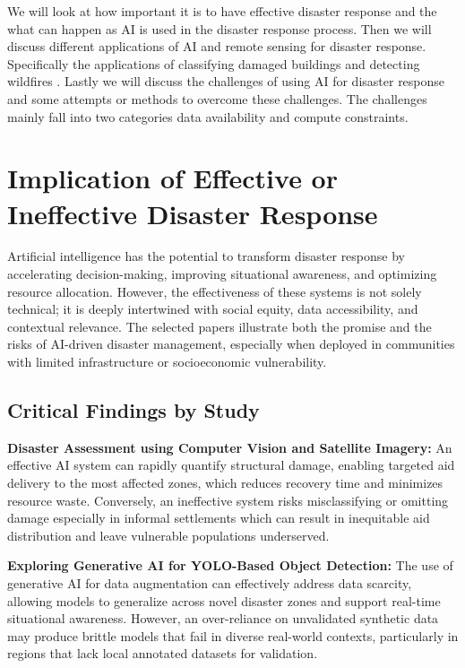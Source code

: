 \documentclass[conference,a4paper]{IEEEtran}
\begin{document}
We will look at how important it is to have effective disaster response and the what can happen as AI is used in the disaster response process. Then we will discuss different applications of AI and remote sensing for disaster response. Specifically the applications of classifying damaged buildings \cite{kimDisasterAssessmentUsing2022,teohExploringGenerativeAI2024,lagapEnhancingPostDisasterDamage2025} and detecting wildfires \cite{elbohy2025fusion,jiaoForestFirePatterns2023}. Lastly we will discuss the challenges of using AI for disaster response and some attempts or methods to overcome these challenges. The challenges mainly fall into two categories data availability and compute constraints.

\section{Implication of Effective or Ineffective Disaster Response}

Artificial intelligence has the potential to transform disaster response by accelerating decision-making, improving situational awareness, and optimizing resource allocation. However, the effectiveness of these systems is not solely technical; it is deeply intertwined with social equity, data accessibility, and contextual relevance. The selected papers illustrate both the promise and the risks of AI-driven disaster management, especially when deployed in communities with limited infrastructure or socioeconomic vulnerability.

\subsection{Critical Findings by Study}

\textbf{Disaster Assessment using Computer Vision and Satellite Imagery:}
An effective AI system can rapidly quantify structural damage, enabling targeted aid delivery to the most affected zones, which reduces recovery time and minimizes resource waste. Conversely, an ineffective system risks misclassifying or omitting damage especially in informal settlements which can result in inequitable aid distribution and leave vulnerable populations underserved.

\textbf{Exploring Generative AI for YOLO-Based Object Detection:}
The use of generative AI for data augmentation can effectively address data scarcity, allowing models to generalize across novel disaster zones and support real-time situational awareness. However, an over-reliance on unvalidated synthetic data may produce brittle models that fail in diverse real-world contexts, particularly in regions that lack local annotated datasets for validation.
\end{document}
